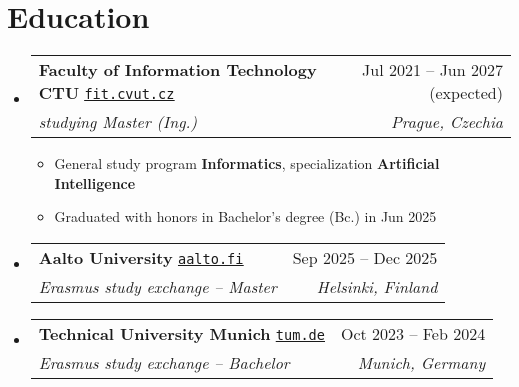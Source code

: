\documentclass[a4paper,11pt]{article}
\makeatletter
\newcommand{\resumeItem}[1]{
  \item\small{#1}
}
\newcommand{\resumeItemListStart}{\begin{itemize}[rightmargin=0.11in]}
\newcommand{\resumeItemListEnd}{\end{itemize}}
\newcommand{\resumeNonboldQuadHeading}[4]{
  \item
  \begin{tabular*}{0.96\textwidth}[t]{l@{\extracolsep{\fill}}r}
    #1 & #2 \\
    \textit{\small#3} & \textit{\small #4} \\
  \end{tabular*}
}
\newcommand{\resumeHeadingListStart}{
  \begin{itemize}[leftmargin=0.15in, label={}]
}
\newcommand{\resumeHeadingListEnd}{\end{itemize}}
\makeatother
\begin{document}

\section{Education}
\resumeHeadingListStart{}
  \resumeNonboldQuadHeading
    {
      \textbf{Faculty of Information Technology CTU} \quad
      \href{https://fit.cvut.cz}{\uline{\texttt{fit.cvut.cz}}}
    }
    {Jul 2021 -- Jun 2027 (expected)}
    {studying Master (Ing.)}
    {Prague, Czechia}
  \resumeItemListStart{}
    \resumeItem{General study program \textbf{Informatics}, specialization \textbf{Artificial Intelligence}}
    \resumeItem{Graduated with honors in Bachelor's degree (Bc.) in Jun 2025}
  \resumeItemListEnd{}

  \resumeNonboldQuadHeading
    {
      \textbf{Aalto University} \quad
      \href{https://aalto.fi}{\uline{\texttt{aalto.fi}}}}
    {Sep 2025 -- Dec 2025}
    {Erasmus study exchange -- Master}
    {Helsinki, Finland}

  \resumeNonboldQuadHeading
    {
      \textbf{Technical University Munich} \quad
      \href{https://tum.de}{\uline{\texttt{tum.de}}}}
    {Oct 2023 -- Feb 2024}
    {Erasmus study exchange -- Bachelor}
    {Munich, Germany}
\resumeHeadingListEnd{}



\end{document}
